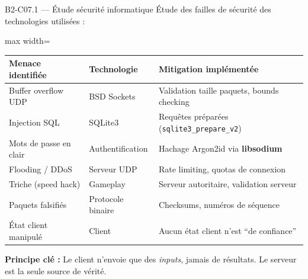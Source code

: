 \documentclass[aspectratio=169,10pt]{beamer}
\begin{document}
\begin{frame}{B2-C07.1 — Étude sécurité informatique}
\footnotesize
Étude des failles de sécurité des technologies utilisées :

\vspace{0.2em}
\begin{adjustbox}{max width=\textwidth}
\begin{tabular}{l l l}
\toprule
\textbf{Menace identifiée} & \textbf{Technologie} & \textbf{Mitigation implémentée} \\
\midrule
Buffer overflow UDP         & BSD Sockets           & Validation taille paquets, bounds checking \\ \hline
Injection SQL               & SQLite3               & Requêtes préparées (\texttt{sqlite3\_prepare\_v2}) \\ \hline
Mots de passe en clair      & Authentification      & Hachage Argon2id via \textbf{libsodium} \\ \hline
Flooding / DDoS             & Serveur UDP           & Rate limiting, quotas de connexion \\ \hline
Triche (speed hack)         & Gameplay              & Serveur autoritaire, validation serveur \\ \hline
Paquets falsifiés           & Protocole binaire     & Checksums, numéros de séquence \\ \hline
État client manipulé        & Client                & Aucun état client n'est ``de confiance'' \\
\bottomrule
\end{tabular}
\end{adjustbox}

\vspace{0.3em}
\textbf{Principe clé :} Le client n'envoie que des \textit{inputs}, jamais de résultats. Le serveur est la seule source de vérité.
\end{frame}
\end{document}
